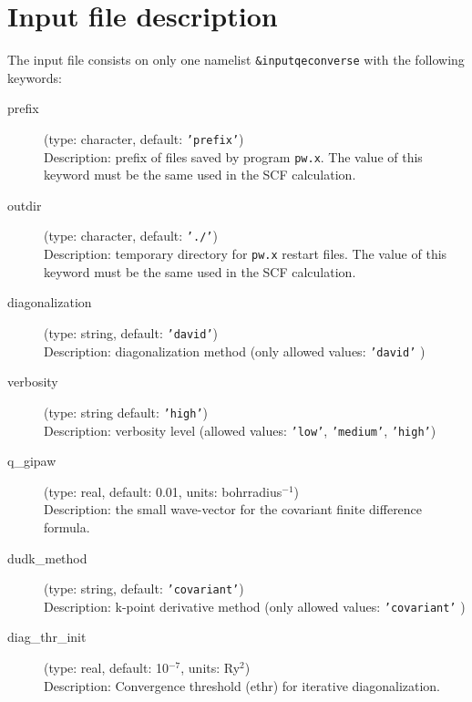 \documentclass[a4paper,11pt,twoside]{article}
\begin{document}
\section{Input file description}
The input file consists on only one namelist \texttt{\&input\textunderscore{}qeconverse} with the
following keywords:
\begin{description}

\item[prefix] (type: character, default: \texttt{'prefix'})\\
Description: prefix of files saved by program \texttt{pw.x}. The value of this keyword must be the same used in the SCF calculation.

\item[outdir] (type: character, default: \texttt{'./'})\\
Description: temporary directory for \texttt{pw.x} restart files. The value of this keyword must be the same used in the SCF calculation.

\item[diagonalization] (type: string, default: \texttt{'david'})\\
Description: diagonalization method (only allowed values: \texttt{'david'} )

\item[verbosity] (type: string default: \texttt{'high'})\\
Description: verbosity level (allowed values: \texttt{'low'}, \texttt{'medium'}, \texttt{'high'})

\item[q\_gipaw] (type: real, default: 0.01, units: bohrradius$^{-1}$)\\
Description: the small wave-vector for the covariant finite difference formula.

\item[dudk\_method] (type: string, default: \texttt{'covariant'})\\
Description: k-point derivative method (only allowed values: \texttt{'covariant'} )

\item[diag\_thr\_init] (type: real, default: 10$^{-7}$, units: Ry$^2$)\\
Description: Convergence threshold (ethr) for iterative diagonalization.


\end{description}
\end{document}
